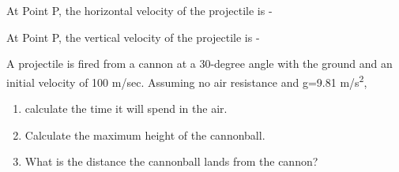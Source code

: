\documentclass[11pt]{examdesign}
\begin{document}
\begin{multiplechoice} [title={Multiple Choice},
	rearrange=no]
\begin{question}
	
At Point P, the horizontal velocity of the projectile is - 

	
\end{question}
\begin{question}
	
At Point P, the vertical velocity of the projectile is - 


\end{question}
\end{multiplechoice}

\pagebreak

\begin{shortanswer}[title={Free Response},
	rearrange=no]
	
	\begin{question}
	A projectile is fired from a cannon at a 30-degree angle with the ground and an initial velocity of 100 m/sec. Assuming no air resistance and g=9.81 m/s\textsuperscript{2},	
		\begin{enumerate}
			\item  calculate the time it will spend in the air.
			\vspace{1 in}
			\item Calculate the maximum height of the cannonball.
			\vspace{1 in}
			\item What is the distance the cannonball lands from the cannon?

		\end{enumerate}
		
	\end{question}

\end{shortanswer}
\end{document}
